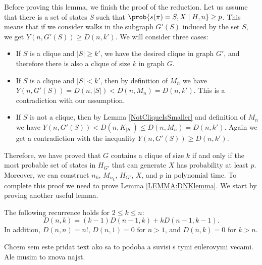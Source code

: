 Before proving this lemma, we finish the proof of the reduction. Let
us assume that there is a set of states $S$ such that
$\prob{s(\pi)=S,X \mid H,n}\ge p$. This means that if we consider walks in the
subgraph $G'(S)$ induced by the set $S$, we get $Y(n,G'(S))\ge
D(n,k')$. We will consider three cases:
\begin{itemize}
\item If $S$ is a clique and $|S|\ge k'$, we have the desired clique in 
graph $G'$, and therefore there is also a clique of size $k$ in graph $G$. 
\item If $S$ is a clique and $|S|<k'$, then by definition of $M_n$ we have 
$Y(n,G'(S))=D(n,|S|)<D(n,M_n) = 
D(n,k')$. This is a contradiction with our assumption. 
\item If $S$ is not a clique, then by Lemma \ref{NotCliqueIsSmaller}
  and definition of $M_n$ we have $Y(n,G'(S)) < D(n, K_{|S|}) \le
  D(n,M_n) = D(n,k')$. Again we get a contradiction with 
the inequality $Y(n,G'(S))\ge D(n,k')$.
\end{itemize}
Therefore, we have proved that $G$ contains a clique of size $k$ if and
only if the most probable set of states in $H_{G'}$ that can generate $X$ has
probability at least $p$. Moreover, we can construct $n_k$, $M_{n_k}$,
$H_{G'}$, $X$, and $p$ in polynomial time.
To complete this proof we need to prove Lemma \ref{LEMMA:DNKlemma}.  We
start by proving another useful lemma.

\begin{lemma}\label{RecurenceLemma}
The following recurrence holds for $2\leq k\leq n$:
$$D(n,k)=(k-1) D(n-1,k) + k D(n-1,k-1).$$
In addition, $D(n,n)=n!$, $D(n,1) = 0$ for $n>1$, and $D(n,k) = 0$ for $k>n$.
\end{lemma}

\begin{reformulate*}
Chcem sem este pridat text ako sa to podoba a suvisi s tymi eulerovymi vecami.
Ale musim to znova najst.
\end{reformulate*}

